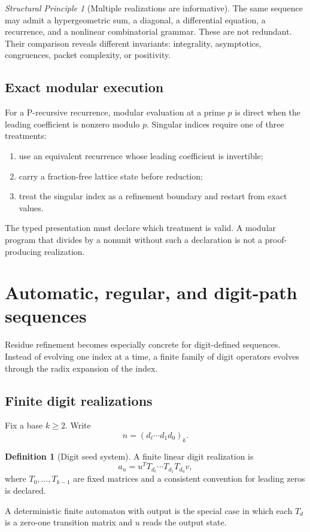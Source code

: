 \documentclass[11pt]{article}
\theoremstyle{definition}\newtheorem{definition}[theorem]{Definition}\newtheorem{example}[theorem]{Example}\newtheorem{construction}[theorem]{Construction}\newtheorem{algorithm}[theorem]{Algorithm}\newtheorem{conjecture}[theorem]{Conjecture}\newtheorem{problem}[theorem]{Problem}
\theoremstyle{remark}\newtheorem{remark}[theorem]{Remark}\newtheorem{boundary}[theorem]{Boundary}\newtheorem{certificate}[theorem]{Computational Certificate}\newtheorem{classical}[theorem]{Classical Input}\newtheorem{principle}[theorem]{Structural Principle}
\begin{document}
\begin{principle}[Multiple realizations are informative]
The same sequence may admit a hypergeometric sum, a diagonal, a differential equation, a recurrence, and a nonlinear combinatorial grammar.  These are not redundant.  Their comparison reveals different invariants: integrality, asymptotics, congruences, packet complexity, or positivity.
\end{principle}

\subsection{Exact modular execution}
For a P-recursive recurrence, modular evaluation at a prime $p$ is direct when the leading coefficient is nonzero modulo $p$.  Singular indices require one of three treatments:
\begin{enumerate}
\item use an equivalent recurrence whose leading coefficient is invertible;
\item carry a fraction-free lattice state before reduction;
\item treat the singular index as a refinement boundary and restart from exact values.
\end{enumerate}
The typed presentation must declare which treatment is valid.  A modular program that divides by a nonunit without such a declaration is not a proof-producing realization.


\section{Automatic, regular, and digit-path sequences}

Residue refinement becomes especially concrete for digit-defined sequences.  Instead of evolving one index at a time, a finite family of digit operators evolves through the radix expansion of the index.

\subsection{Finite digit realizations}
Fix a base $k\geq2$.  Write
\[
 n=(d_\ell\cdots d_1d_0)_k.
\]
\begin{definition}[Digit seed system]
A finite linear digit realization is
\[
 \boxed{a_n=u^TT_{d_\ell}\cdots T_{d_1}T_{d_0}v,}
\]
where $T_0,\ldots,T_{k-1}$ are fixed matrices and a consistent convention for leading zeros is declared.
\end{definition}
A deterministic finite automaton with output is the special case in which each $T_d$ is a zero-one transition matrix and $u$ reads the output state.
\end{document}
